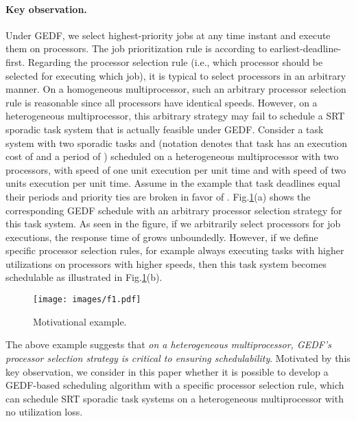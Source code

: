 \documentclass[Times, 10pt,twocolumn]{article}
\theoremstyle{definition}
\begin{document}
\paragraph{Key observation.} Under GEDF, we select  highest-priority jobs at any time instant and execute them on  processors. The job prioritization rule is according to earliest-deadline-first. Regarding the processor selection rule (i.e., which processor should be selected for executing which job), it is typical to select processors in an arbitrary manner. On a homogeneous multiprocessor, such an arbitrary processor selection rule is reasonable since all processors have identical speeds. However, on a heterogeneous multiprocessor, this arbitrary strategy may fail to schedule a SRT sporadic task system that is actually feasible under GEDF. Consider a task system with two sporadic tasks  and  (notation  denotes that task  has an execution cost of  and a period of ) scheduled on a heterogeneous multiprocessor with two processors,  with speed of one unit execution per unit time and  with speed of two units execution per unit time. Assume in the example that task deadlines equal their periods and priority ties are broken in favor of . Fig.\ref{fig:simpleexample}(a) shows the corresponding GEDF schedule with an  arbitrary processor selection strategy for this task system. As seen in the figure, if we arbitrarily select processors for job executions, the response time of  grows unboundedly. However, if we define specific processor selection rules, for example always executing tasks with higher utilizations on processors with higher speeds, then this task system becomes schedulable as illustrated in Fig.\ref{fig:simpleexample}(b).

\begin{figure}[t]
	\begin{center}
	\texttt{[image: images/f1.pdf]} 
	\end{center}  
\vspace{-3mm}
\caption{Motivational example.}
\vspace{-3mm}
\label{fig:simpleexample}
\end{figure}



The above example suggests that \textit{on a heterogeneous multiprocessor, GEDF's processor selection strategy is critical to ensuring schedulability}. Motivated by this key observation, we consider in this paper whether it is possible to develop a GEDF-based scheduling algorithm with a specific processor selection rule, which can schedule SRT sporadic task systems on a heterogeneous multiprocessor with no utilization loss.
\end{document}
